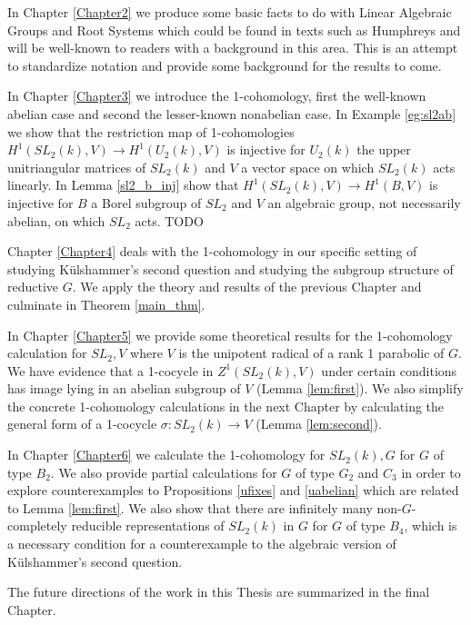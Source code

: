 In Chapter \ref{Chapter2} we produce some basic facts to do with Linear Algebraic Groups and Root Systems which could be found in texts such as Humphreys \cite{humphreys1975linear} and will be well-known to readers with a background in this area. This is an attempt to standardize notation and provide some background for the results to come.

In Chapter \ref{Chapter3} we introduce the 1-cohomology, first the well-known abelian case and second the lesser-known nonabelian case. In Example \ref{eg:sl2ab} we show that the restriction map of 1-cohomologies $H^1(SL_2(k), V) \rightarrow H^1(U_2(k), V)$ is injective for $U_2(k)$ the upper unitriangular matrices of $SL_2(k)$ and $V$ a vector space on which $SL_2(k)$ acts linearly. In Lemma \ref{sl2_b_inj} show that $H^1(SL_2(k), V) \rightarrow H^1(B, V)$ is injective for $B$ a Borel subgroup of $SL_2$ and $V$ an algebraic group, not necessarily abelian, on which $SL_2$ acts. TODO

Chapter \ref{Chapter4} deals with the 1-cohomology in our specific setting of studying K\"ulshammer's second question and studying the subgroup structure of reductive $G$. We apply the theory and results of the previous Chapter and culminate in Theorem \ref{main_thm}.

In Chapter \ref{Chapter5} we provide some theoretical results for the 1-cohomology calculation for $SL_2, V$ where $V$ is the unipotent radical of a rank 1 parabolic of $G$. We have evidence that a 1-cocycle in $Z^1(SL_2(k), V)$ under certain conditions has image lying in an abelian subgroup of $V$ (Lemma \ref{lem:first}). We also simplify the concrete 1-cohomology calculations in the next Chapter by calculating the general form of a 1-cocycle $\sigma:SL_2(k)\rightarrow V$ (Lemma \ref{lem:second}).

In Chapter \ref{Chapter6} we calculate the 1-cohomology for $SL_2(k), G$ for $G$ of type $B_2$. We also provide partial calculations for $G$ of type $G_2$ and $C_3$ in order to explore counterexamples to Propositions \ref{ufixes} and \ref{uabelian} which are related to Lemma \ref{lem:first}. We also show that there are infinitely many non-$G$-completely reducible representations of $SL_2(k)$ in $G$ for $G$ of type $B_4$, which is a necessary condition for a counterexample to the algebraic version of K\"ulshammer's second question.

The future directions of the work in this Thesis are summarized in the final Chapter.
